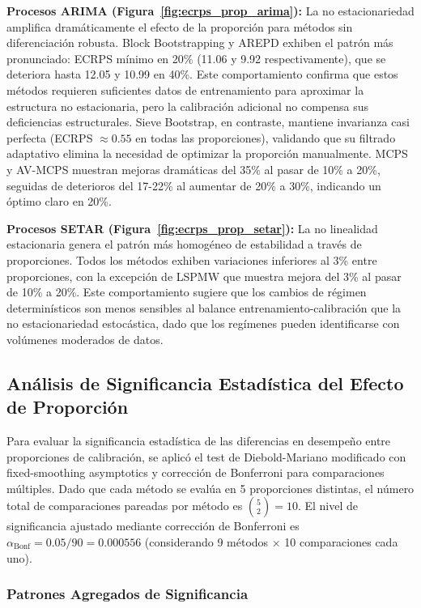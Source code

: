 \textbf{Procesos ARIMA (Figura~\ref{fig:ecrps_prop_arima}):} La no estacionariedad amplifica dramáticamente el efecto de la proporción para métodos sin diferenciación robusta. Block Bootstrapping y AREPD exhiben el patrón más pronunciado: ECRPS mínimo en 20\% (11.06 y 9.92 respectivamente), que se deteriora hasta 12.05 y 10.99 en 40\%. Este comportamiento confirma que estos métodos requieren suficientes datos de entrenamiento para aproximar la estructura no estacionaria, pero la calibración adicional no compensa sus deficiencias estructurales. Sieve Bootstrap, en contraste, mantiene invarianza casi perfecta (ECRPS $\approx 0.55$ en todas las proporciones), validando que su filtrado adaptativo elimina la necesidad de optimizar la proporción manualmente. MCPS y AV-MCPS muestran mejoras dramáticas del 35\% al pasar de 10\% a 20\%, seguidas de deterioros del 17-22\% al aumentar de 20\% a 30\%, indicando un óptimo claro en 20\%.

\textbf{Procesos SETAR (Figura~\ref{fig:ecrps_prop_setar}):} La no linealidad estacionaria genera el patrón más homogéneo de estabilidad a través de proporciones. Todos los métodos exhiben variaciones inferiores al 3\% entre proporciones, con la excepción de LSPMW que muestra mejora del 3\% al pasar de 10\% a 20\%. Este comportamiento sugiere que los cambios de régimen determinísticos son menos sensibles al balance entrenamiento-calibración que la no estacionariedad estocástica, dado que los regímenes pueden identificarse con volúmenes moderados de datos.

\subsection{Análisis de Significancia Estadística del Efecto de Proporción}
\label{subsec:dm_proporciones}

Para evaluar la significancia estadística de las diferencias en desempeño entre proporciones de calibración, se aplicó el test de Diebold-Mariano modificado con fixed-smoothing asymptotics y corrección de Bonferroni para comparaciones múltiples. Dado que cada método se evalúa en 5 proporciones distintas, el número total de comparaciones pareadas por método es $\binom{5}{2} = 10$. El nivel de significancia ajustado mediante corrección de Bonferroni es $\alpha_{\text{Bonf}} = 0.05/90 = 0.000556$ (considerando 9 métodos $\times$ 10 comparaciones cada uno).

\subsubsection{Patrones Agregados de Significancia}


